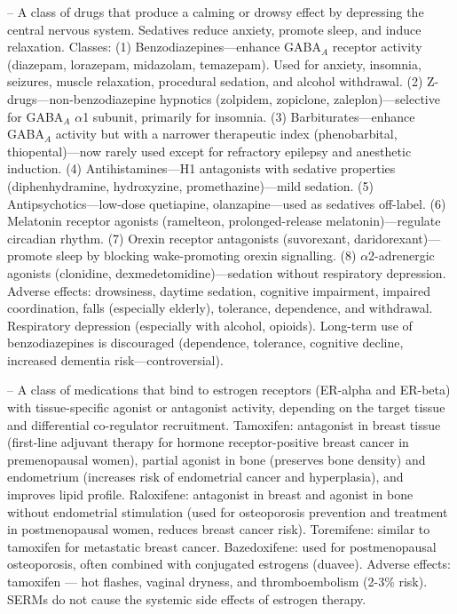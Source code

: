 -- A class of drugs that produce a calming or drowsy effect by depressing the central nervous system. Sedatives reduce anxiety, promote sleep, and induce relaxation. Classes: (1) Benzodiazepines—enhance GABA$_A$ receptor activity (diazepam, lorazepam, midazolam, temazepam). Used for anxiety, insomnia, seizures, muscle relaxation, procedural sedation, and alcohol withdrawal. (2) Z-drugs—non-benzodiazepine hypnotics (zolpidem, zopiclone, zaleplon)—selective for GABA$_A$ $\alpha$1 subunit, primarily for insomnia. (3) Barbiturates—enhance GABA$_A$ activity but with a narrower therapeutic index (phenobarbital, thiopental)—now rarely used except for refractory epilepsy and anesthetic induction. (4) Antihistamines—H1 antagonists with sedative properties (diphenhydramine, hydroxyzine, promethazine)—mild sedation. (5) Antipsychotics—low-dose quetiapine, olanzapine—used as sedatives off-label. (6) Melatonin receptor agonists (ramelteon, prolonged-release melatonin)—regulate circadian rhythm. (7) Orexin receptor antagonists (suvorexant, daridorexant)—promote sleep by blocking wake-promoting orexin signalling. (8) $\alpha$2-adrenergic agonists (clonidine, dexmedetomidine)—sedation without respiratory depression. Adverse effects: drowsiness, daytime sedation, cognitive impairment, impaired coordination, falls (especially elderly), tolerance, dependence, and withdrawal. Respiratory depression (especially with alcohol, opioids). Long-term use of benzodiazepines is discouraged (dependence, tolerance, cognitive decline, increased dementia risk—controversial).

-- A class of medications that bind to estrogen receptors (ER-alpha and ER-beta) with tissue-specific agonist or antagonist activity, depending on the target tissue and differential co-regulator recruitment. Tamoxifen: antagonist in breast tissue (first-line adjuvant therapy for hormone receptor-positive breast cancer in premenopausal women), partial agonist in bone (preserves bone density) and endometrium (increases risk of endometrial cancer and hyperplasia), and improves lipid profile. Raloxifene: antagonist in breast and agonist in bone without endometrial stimulation (used for osteoporosis prevention and treatment in postmenopausal women, reduces breast cancer risk). Toremifene: similar to tamoxifen for metastatic breast cancer. Bazedoxifene: used for postmenopausal osteoporosis, often combined with conjugated estrogens (duavee). Adverse effects: tamoxifen — hot flashes, vaginal dryness, and thromboembolism (2-3\% risk). SERMs do not cause the systemic side effects of estrogen therapy.


